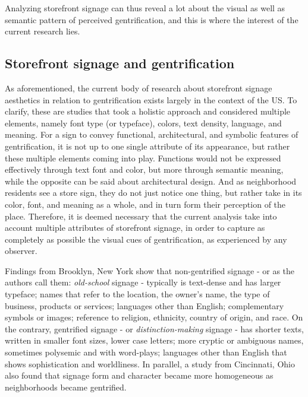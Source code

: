 Analyzing storefront signage can thus reveal a lot about the visual as well as semantic pattern of perceived gentrification, and this is where the interest of the current research lies.


\subsection{Storefront signage and gentrification}

As aforementioned, the current body of research about storefront signage aesthetics in relation to gentrification exists largely in the context of the US. To clarify, these are studies that took a holistic approach and considered multiple elements, namely font type (or typeface), colors, text density, language, and meaning. For a sign to convey functional, architectural, and symbolic features of gentrification, it is not up to one single attribute of its appearance, but rather these multiple elements coming into play. Functions would not be expressed effectively through text font and color, but more through semantic meaning, while the opposite can be said about architectural design. And as neighborhood residents see a store sign, they do not just notice one thing, but rather take in its color, font, and meaning as a whole, and in turn form their perception of the place. Therefore, it is deemed necessary that the current analysis take into account multiple attributes of storefront signage, in order to capture as completely as possible the visual cues of gentrification, as experienced by any observer.

Findings from Brooklyn, New York\cite{trinch_signsays_2017, snajdr_oldschool_2018, snajdr_preserve_2022} show that non-gentrified signage - or as the authors call them: \textit{old-school} signage - typically is text-dense and has larger typeface; names that refer to the location, the owner's name, the type of business, products or services; languages other than English; complementary symbols or images; reference to religion, ethnicity, country of origin, and race. On the contrary, gentrified signage - or \textit{distinction-making} signage - has shorter texts, written in smaller font sizes, lower case letters; more cryptic or ambiguous names, sometimes polysemic and with word-plays; languages other than English that shows sophistication and worldliness. In parallel, a study from Cincinnati, Ohio \cite{rahman2020} also found that signage form and character became more homogeneous as neighborhoods became gentrified.

